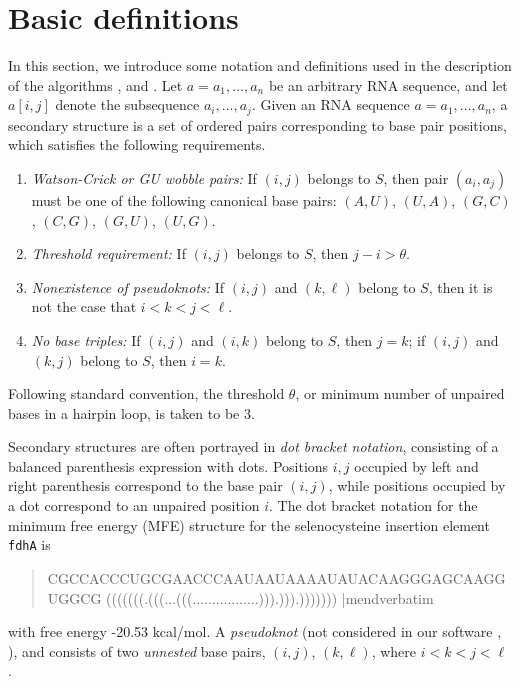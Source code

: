 \section{Basic definitions}
\label{section:definitions}

In this section, we introduce some notation and definitions used in the
description of the algorithms {\rnahairpin}, {\rnamlnumber} and
{\rnamlorder}.
Let $a = a_1,\ldots,a_n$ be an arbitrary
RNA sequence, and let $a[i,j]$ denote the subsequence $a_i,\ldots,a_j$.
Given an RNA sequence $a = a_1,\ldots,a_n$, a secondary structure is
a set of ordered pairs corresponding to
base pair positions, which satisfies the following requirements.
\begin{enumerate}
\item
{\em Watson-Crick or GU wobble pairs:}
If $(i,j)$ belongs to $S$, then pair $(a_i,a_j)$ must be one of the following
canonical base pairs:
$(A,U)$, $(U,A)$, $(G,C)$, $(C,G)$, $(G,U)$, $(U,G)$.
\item
{\em Threshold requirement:}
If $(i,j)$ belongs to $S$, then $j-i > \theta$.
\item
{\em Nonexistence of pseudoknots:}
If $(i,j)$ and $(k,\ell)$ belong to $S$, then it is not the case that
$i<k<j<\ell$.
\item
{\em No base triples:}
If $(i,j)$ and $(i,k)$ belong to $S$, then $j=k$;
if $(i,j)$ and $(k,j)$ belong to $S$, then $i=k$.
\end{enumerate}
Following standard convention,
the threshold $\theta$, or minimum number of unpaired
bases in a hairpin loop, is taken to be $3$.

Secondary structures are
often portrayed in {\em dot bracket notation}, consisting of a balanced
parenthesis expression with dots. Positions $i,j$ occupied by left and
right parenthesis correspond to the base pair $(i,j)$, while positions
occupied by a dot correspond to an unpaired position $i$. The dot bracket
notation for the minimum free energy (MFE) structure for
the selenocysteine insertion element {\tt fdhA} is
\begin{quote}
\begin{tiny}
\mverbatim
CGCCACCCUGCGAACCCAAUAAUAAAAUAUACAAGGGAGCAAGGUGGCG
(((((((.(((...(((.................))).))).)))))))
|mendverbatim
\end{tiny}
\end{quote}
with free energy -20.53 kcal/mol.
A {\em pseudoknot} (not considered in our software
{\rnahairpin}, {\rnamlnumber}), and {\rnamlorder}
consists of two {\em unnested} base
pairs, $(i,j)$, $(k,\ell)$, where $i<k<j<\ell$.

